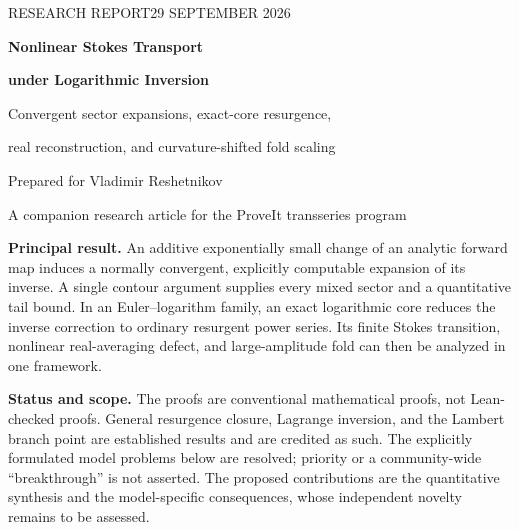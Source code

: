 \documentclass[11pt,a4paper]{article}
\numberwithin{equation}{section}
\theoremstyle{definition}
\theoremstyle{remark}
\begin{document}
\hypersetup{pageanchor=false}
\begin{titlepage}
\thispagestyle{empty}
\vspace*{12mm}
{\sffamily\small RESEARCH REPORT\hfill 29 SEPTEMBER 2026\par}
\vspace{19mm}
{\Huge\bfseries Nonlinear Stokes Transport\par}
\vspace{4mm}
{\LARGE\bfseries under Logarithmic Inversion\par}
\vspace{9mm}
{\Large Convergent sector expansions, exact-core resurgence,\par
real reconstruction, and curvature-shifted fold scaling\par}
\vspace{13mm}
{\large Prepared for Vladimir Reshetnikov\par}
{\normalsize A companion research article for the ProveIt transseries program\par}
\vspace{14mm}
\begin{tcolorbox}[colback=blue!3,colframe=blue!35!black,boxrule=.5pt,arc=1mm]
\textbf{Principal result.} An additive exponentially small change of an analytic forward map induces a normally convergent, explicitly computable expansion of its inverse. A single contour argument supplies every mixed sector and a quantitative tail bound. In an Euler--logarithm family, an exact logarithmic core reduces the inverse correction to ordinary resurgent power series. Its finite Stokes transition, nonlinear real-averaging defect, and large-amplitude fold can then be analyzed in one framework.
\end{tcolorbox}
\vfill
\noindent\textbf{Status and scope.} The proofs are conventional mathematical proofs, not Lean-checked proofs. General resurgence closure, Lagrange inversion, and the Lambert branch point are established results and are credited as such. The explicitly formulated model problems below are resolved; priority or a community-wide ``breakthrough'' is not asserted. The proposed contributions are the quantitative synthesis and the model-specific consequences, whose independent novelty remains to be assessed.
\end{titlepage}
\hypersetup{pageanchor=true}
\end{document}

